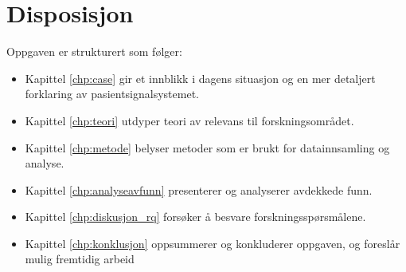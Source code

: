 \section{Disposisjon}
Oppgaven er strukturert som følger:
\begin{itemize}
\item Kapittel \ref{chp:case} gir et innblikk i dagens situasjon og en mer detaljert forklaring av pasientsignalsystemet.
\item Kapittel \ref{chp:teori} utdyper teori av relevans til forskningsområdet.
\item Kapittel \ref{chp:metode} belyser metoder som er brukt for datainnsamling og analyse.
\item Kapittel \ref{chp:analyseavfunn} presenterer og analyserer avdekkede funn.
\item Kapittel \ref{chp:diskusjon_rq} forsøker å besvare forskningsspørsmålene.
\item Kapittel \ref{chp:konklusjon} oppsummerer og konkluderer oppgaven, og foreslår mulig fremtidig arbeid
\end{itemize}

